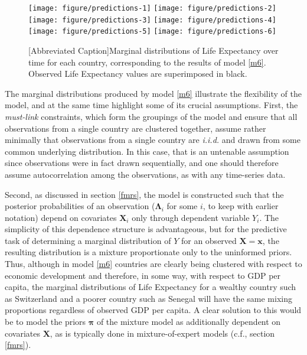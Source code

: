 \documentclass[10pt]{olplainarticle}\usepackage[]{graphicx}\usepackage[]{color}
\newenvironment{knitrout}{}{} %
\begin{document}
\begin{figure}[H]
\begin{knitrout}
\color{fgcolor}

{\centering \texttt{[image: figure/predictions-1]} 
\texttt{[image: figure/predictions-2]} 
\texttt{[image: figure/predictions-3]} 
\texttt{[image: figure/predictions-4]} 
\texttt{[image: figure/predictions-5]} 
\texttt{[image: figure/predictions-6]} 

}



\end{knitrout}
[Abbreviated Caption]{Marginal distributions of Life Expectancy over time for each country, corresponding to the results of model \ref{m6}. Observed Life Expectancy values are superimposed in black.}
\end{figure}


The marginal distributions produced by model \ref{m6} illustrate the flexibility of the model, and at the same time highlight some of its crucial assumptions. First, the \emph{must-link} constraints, which form the groupings of the model and ensure that all observations from a single country are clustered together, assume rather minimally that observations from a single country are \emph{i.i.d.} and drawn from some common underlying distribution. In this case, that is an untenable assumption since observations were in fact drawn sequentially, and one should therefore assume autocorrelation among the observations, as with any time-series data. 

Second, as discussed in section \ref{fmrs}, the model is constructed such that the posterior probabilities of an observation ($\boldsymbol{\Lambda}_i$ for some $i$, to keep with earlier notation) depend on covariates $\boldsymbol{X}_i$ only through dependent variable $Y_i$. The simplicity of this dependence structure is advantageous, but for the predictive task of determining a marginal distribution of $Y$ for an observed $\boldsymbol{X} = \boldsymbol{x}$, the resulting distribution is a mixture proportionate only to the uninformed priors. Thus, although in model \ref{m6} countries are clearly being clustered with respect to economic development and therefore, in some way, with respect to GDP per capita, the marginal distributions of Life Expectancy for a wealthy country such as Switzerland and a poorer country such as Senegal will have the same mixing proportions regardless of observed GDP per capita. A clear solution to this would be to model the priors $\boldsymbol{\pi}$ of the mixture model as additionally dependent on covariates $\boldsymbol{X}$, as is typically done in mixture-of-expert models (c.f., section \ref{fmrs}).
\end{document}
